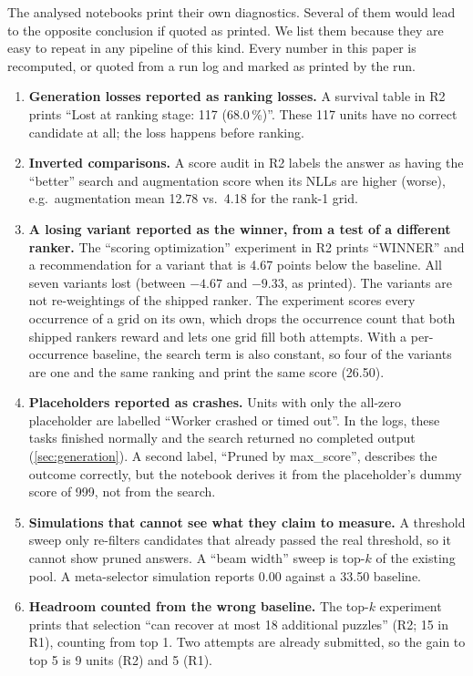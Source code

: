\documentclass[11pt]{article}
\newcommand{\R}[1]{R#1}
\begin{document}
The analysed notebooks print their own diagnostics. Several of them would lead to the opposite conclusion if quoted as printed. We list them because they are easy to repeat in any pipeline of this kind. Every number in this paper is recomputed, or quoted from a run log and marked as printed by the run.
\begin{enumerate}
\item \textbf{Generation losses reported as ranking losses.} A survival table in \R{2} prints ``Lost at ranking stage: 117 (68.0\,\%)''. These 117 units have no correct candidate at all; the loss happens before ranking.
\item \textbf{Inverted comparisons.} A score audit in \R{2} labels the answer as having the ``better'' search and augmentation score when its NLLs are higher (worse), e.g.\ augmentation mean 12.78 vs.\ 4.18 for the rank-1 grid.
\item \textbf{A losing variant reported as the winner, from a test of a different ranker.} The ``scoring optimization'' experiment in \R{2} prints ``WINNER'' and a recommendation for a variant that is 4.67 points below the baseline. All seven variants lost (between $-4.67$ and $-9.33$, as printed).
The variants are not re-weightings of the shipped ranker. The experiment scores every occurrence of a grid on its own, which drops the occurrence count that both shipped rankers reward and lets one grid fill both attempts. With a per-occurrence baseline, the search term is also constant, so four of the variants are one and the same ranking and print the same score (26.50).
\item \textbf{Placeholders reported as crashes.} Units with only the all-zero placeholder are labelled ``Worker crashed or timed out''. In the logs, these tasks finished normally and the search returned no completed output (\cref{sec:generation}).
A second label, ``Pruned by max\_score'', describes the outcome correctly, but the notebook derives it from the placeholder's dummy score of 999, not from the search.
\item \textbf{Simulations that cannot see what they claim to measure.} A threshold sweep only re-filters candidates that already passed the real threshold, so it cannot show pruned answers. A ``beam width'' sweep is top-$k$ of the existing pool. A meta-selector simulation reports 0.00 against a 33.50 baseline.
\item \textbf{Headroom counted from the wrong baseline.} The top-$k$ experiment prints that selection ``can recover at most 18 additional puzzles'' (\R{2}; 15 in \R{1}), counting from top 1. Two attempts are already submitted, so the gain to top 5 is 9 units (\R{2}) and 5 (\R{1}).

\end{enumerate}
\end{document}

